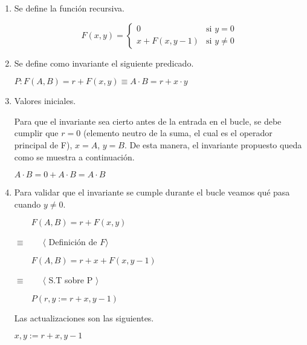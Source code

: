 \documentclass[hidelinks]{article}
\begin{document}
\begin{enumerate}
	\item Se define la función recursiva.\par

	      \begin{equation}
		      F(x,y) =
		      \begin{cases}
			      0               & \text{si } y = 0    \\
			      x + F(x, y - 1) & \text{si } y \neq 0
		      \end{cases}
	      \end{equation} \par

	\item Se define como invariante el siguiente predicado.\par
	      \begin{center}
		      $P: F(A,B) = r + F(x,y) \equiv A \cdot B = r + x \cdot y$\par
	      \end{center}

	\item Valores iniciales.\par
	      Para que el invariante sea cierto antes de la entrada en el bucle, se debe
	      cumplir que $r = 0$ (elemento neutro de la suma, el cual es el operador
	      principal de F), $x = A$, $y = B$. De esta manera, el invariante propuesto
	      queda como se muestra a continuación.\par

	      $A \cdot B = 0 + A \cdot B = A \cdot B$\par
	\item Para validar que el invariante se cumple durante el bucle veamos qué pasa
	      cuando $y \neq 0$.\par
	      $\qquad F(A,B) = r + F(x,y)$\par
	      $\equiv \qquad \langle $ Definición de $ F \rangle$\par
	      $\qquad F(A,B) = r + x + F(x, y - 1)$\par
	      $\equiv \qquad \langle $ S.T sobre P $\rangle$\par
	      $\qquad P(r,y := r + x, y - 1)$\par
	      Las actualizaciones son las siguientes.\par

	      \begin{center}
		      $x,y := r + x, y - 1$\par
	      \end{center}


\end{enumerate}
\end{document}
